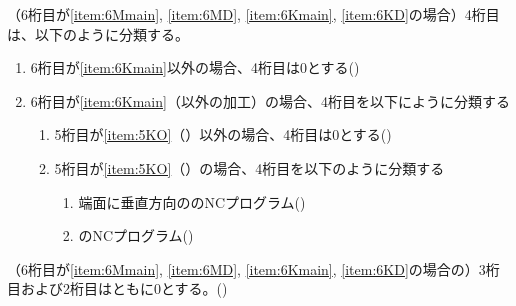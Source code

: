 （6桁目が\ref{item:6Mmain}, \ref{item:6MD}, \ref{item:6Kmain}, \ref{item:6KD}の場合）4桁目は、以下のように分類する。
\begin{enumerate}[label=\alph*), ref=\alph*)]
\item 6桁目が\ref{item:6Kmain}\hx 以外の場合、4桁目は0とする({})
\item 6桁目が\ref{item:6Kmain}（\Dimple 以外の加工）の場合、4桁目を以下にように分類する
  \begin{enumerate}[label=\alph{enumi}\,-\arabic*), leftmargin=\leftmargini]
  \item 5桁目が\ref{item:5KO}（\OutcutMilling）以外の場合、4桁目は0とする({})
  \item 5桁目が\ref{item:5KO}（\OutcutMilling）の場合、4桁目を以下のように分類する
    \begin{enumerate}[label=\arabic*., ref=\arabic*, start=0, leftmargin=*]
    \item 端面に垂直方向の\OutcutMilling のNCプログラム({})
    \item \CurvedOutcutMilling のNCプログラム({})
    \end{enumerate}
  \end{enumerate}
\end{enumerate}



（6桁目が\ref{item:6Mmain}, \ref{item:6MD}, \ref{item:6Kmain}, \ref{item:6KD}\hx の場合の）3桁目および2桁目はともに0とする。({})


